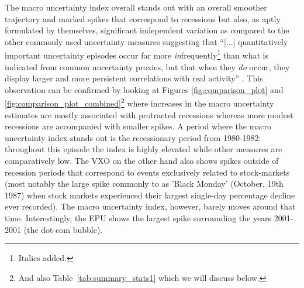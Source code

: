 \documentclass[a4paper,11pt,listof=nochaptergap,oneside,pointednumbers,bibtotoc,bigheadings,liststotoc,hidelinks]{scrbook}
\theoremstyle{mysatz}
\theoremstyle{mydefinition}
\theoremstyle{mytheorem}
\theoremstyle{mybemerkung}
\begin{document}
The macro uncertainty index overall stands out with an overall smoother trajectory and marked spikes that correspond to recessions but also, as aptly formulated by \citet{juradoetal:15} themselves, significant independent variation as compared to the other commonly used uncertainty measures suggesting that ``[...] quantitatively important uncertainty episodes occur far more \textit{in}frequently\footnote{Italics added.} than what is indicated from common uncertainty proxies, but that when they \textit{do} occur, they display larger and more persistent correlations with real activity'' \citep[p. 1181]{juradoetal:15}. This observation can be confirmed by looking at Figures \ref{fig:comparison_plot} and \ref{fig:comparison_plot_combined}\footnote{And also Table~\ref{tab:summary_stats1} which we will discuss below.} where increases in the macro uncertainty estimates are mostly associated with protracted recessions whereas more modest recessions are accompanied with smaller spikes. A period where the macro uncertainty index stands out is the recessionary period from 1980-1982: throughout this episode the index is highly elevated while other measures are comparatively low. The VXO on the other hand also shows spikes outside of recession periods that correspond to events exclusively related to stock-markets (most notably the large spike commonly to as 'Black Monday' (October, 19th 1987) when stock markets experienced their largest single-day percentage decline ever recorded). The macro uncertainty index, however, barely moves around that time. Interestingly, the EPU shows the largest spike surrounding the years 2001-2001 (the dot-com bubble). 

\begin{table}[t]
\centering
\caption[Correlation matrix of uncertainty measures.]{Correlation matrix of uncertainty measures. [check correlation between EPU and Macro! \citet{bakeretal:15}] report a value of 0.42 while we get 0.15!; also, after re-estimation the correlation between VXO and MACRO decreased from 0.63 to 0.53 --> check again!}
\label{tab:correlations}
\end{table}
\end{document}
